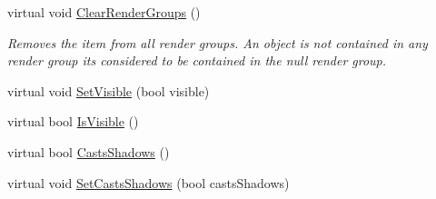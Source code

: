\begin{DoxyCompactItemize}
\item 
\mbox{\label{class_geometry_engine_1_1_geometry_world_item_1_1_geometry_item_1_1_geometry_item_a1dc7f2bbe7fc049344b055dfa21414b8}} 
virtual void \mbox{\hyperlink{class_geometry_engine_1_1_geometry_world_item_1_1_geometry_item_1_1_geometry_item_a1dc7f2bbe7fc049344b055dfa21414b8}{Clear\+Render\+Groups}} ()
\begin{DoxyCompactList}\small\item\em Removes the item from all render groups. An object is not contained in any render group it\textquotesingle{}s considered to be contained in the null render group. \end{DoxyCompactList}\item 
virtual void \mbox{\hyperlink{class_geometry_engine_1_1_geometry_world_item_1_1_geometry_item_1_1_geometry_item_ab2ed6e137c09bd08335452fa4bb7742a}{Set\+Visible}} (bool visible)
\item 
virtual bool \mbox{\hyperlink{class_geometry_engine_1_1_geometry_world_item_1_1_geometry_item_1_1_geometry_item_a7fece5cb2992278b918286e3aeb9b561}{Is\+Visible}} ()
\item 
virtual bool \mbox{\hyperlink{class_geometry_engine_1_1_geometry_world_item_1_1_geometry_item_1_1_geometry_item_a4b9c066cbd4ab85ffae11bb4dcd9fc64}{Casts\+Shadows}} ()
\item 
virtual void \mbox{\hyperlink{class_geometry_engine_1_1_geometry_world_item_1_1_geometry_item_1_1_geometry_item_a3851222930b03bafdf0338df339022d2}{Set\+Casts\+Shadows}} (bool casts\+Shadows)
\end{DoxyCompactItemize}
